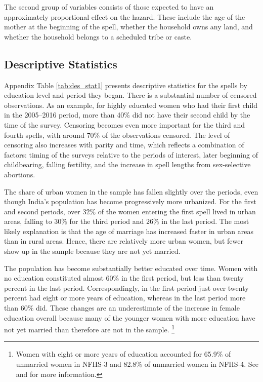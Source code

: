 \documentclass[12pt,letterpaper]{article}
\begin{document}
The second group of variables consists of those expected to have an 
approximately proportional effect on the hazard.
These include
the age of the mother at the beginning of the spell, 
whether the household owns any land, 
and whether the household belongs to a scheduled tribe or caste.


\subsection{Descriptive Statistics}

Appendix Table \ref{tab:des_stat1} presents descriptive statistics for
the spells by education level and period they began.
There is a substantial number of censored observations.
As an example, for highly educated women who had their first child in the 2005--2016
period, more than 40\% did not have their second child by the time of the survey.
Censoring becomes even more important for the third and fourth
spells, with around 70\% of the observations censored.
The level of censoring also increases with parity and time,
which reflects a combination of factors: timing of the surveys
relative to the periods of interest, later beginning of childbearing, 
falling fertility, and the increase in spell lengths from 
sex-selective abortions.

The share of urban women in the sample has fallen slightly over the
periods, even though India's population has become progressively more urbanized.
For the first and second periods, over 32\% of the women 
entering the first spell lived in urban areas, falling to 
30\% for the third period and 26\% in the last period.
The most likely explanation is that the age of marriage has increased
faster in urban areas than in rural areas.
Hence, there are relatively more urban women, but fewer show up in the
sample because they are not yet married.

The population has become substantially better educated over time.
Women with no education constituted almost 60\% 
in the first period, but less than twenty percent in the last period.
Correspondingly, in the first period just over twenty percent had eight or more 
years of education, whereas in the last period more than 60\% did.
These changes are an underestimate of the increase in female
education overall because many of the younger women with more education
have not yet married than therefore are not in the sample.%
\footnote{
Women with eight or more years of education accounted for 65.9\% of
unmarried women in NFHS-3 and 82.8\% of unmarried women in NFHS-4.
See \citet[p 56]{International-Institute-for-Population-Sciences-IIPS2007}
and \citet[p 61]{International-Institute-for-Population-Sciences-IIPS2017}
for more information.
 }
\end{document}
